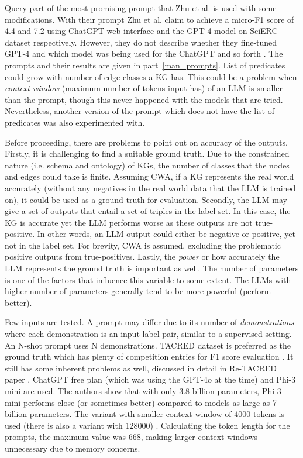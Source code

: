 \documentclass{article}
\begin{document}
Query part of the most promising prompt that Zhu et al. is used with some modifications. With their prompt Zhu et al. claim to achieve a micro-F1 score of 4.4 and 7.2 using ChatGPT web interface and the GPT-4 model on SciERC dataset respectively. However, they do not describe whether they fine-tuned GPT-4 and which model was being used for the ChatGPT and so forth \cite{zhu_llms_2024}. The prompts and their results are given in part~\ref{man_prompts}. List of predicates could grow with number of edge classes a KG has. This could be a problem when \textit{context window} (maximum number of tokens input has) of an LLM is smaller than the prompt, though this never happened with the models that are tried. Nevertheless, another version of the prompt which does not have the list of predicates was also experimented with. 

Before proceeding, there are problems to point out on accuracy of the outputs. Firstly, it is challenging to find a suitable ground truth. Due to the constrained nature (i.e. schema and ontology) of KGs, the number of classes that the nodes and edges could take is finite. Assuming CWA, if a KG represents the real world accurately (without any negatives in the real world data that the LLM is trained on), it could be used as a ground truth for evaluation. Secondly, the LLM may give a set of outputs that entail a set of triples in the label set. In this case, the KG is accurate yet the LLM performs worse as these outputs are not true-positive. In other words, an LLM output could either be negative or positive, yet not in the label set. For brevity, CWA is assumed, excluding the problematic positive outputs from true-positives. Lastly, the \textit{power} or how accurately the LLM represents the ground truth is important as well. The number of parameters is one of the factors that influence this variable to some extent. The LLMs with higher number of parameters generally tend to be more powerful (perform better). 

Few inputs are tested. A prompt may differ due to its number of \textit{demonstrations} where each demonstration is an input-label pair, similar to a supervised setting. An N-shot prompt uses N demonstrations. TACRED dataset is preferred as the ground truth which has plenty of competition entries for F1 score evaluation \cite{zhang_position-aware_2017,noauthor_tacred_nodate}. It still has some inherent problems as well, discussed in detail in Re-TACRED paper \cite{stoica_re-tacred_2021}. ChatGPT free plan (which was using the GPT-4o at the time) and Phi-3 mini are used. The authors show that with only 3.8 billion parameters, Phi-3 mini performs close (or sometimes better) compared to models as large as 7 billion parameters. The variant with smaller context window of 4000 tokens is used (there is also a variant with 128000) \cite{abdin_phi-3_2024}. Calculating the token length for the prompts, the maximum value was 668, making larger context windows unnecessary due to memory concerns. 
\end{document}

